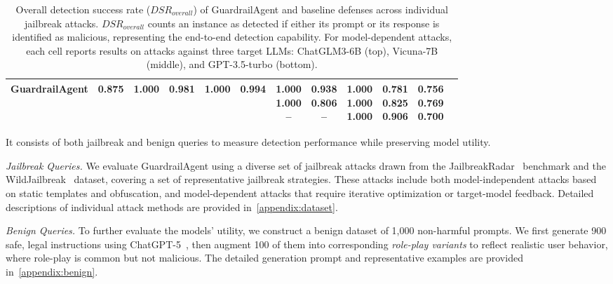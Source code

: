 \documentclass[letterpaper,twocolumn,10pt]{article}
\newcommand{\mypara}[1]{\noindent{\bf {#1}.} \xspace}
\newcommand{\agentname}{GuardrailAgent\xspace}
\newcommand{\dsro}{$DSR_{overall}$\xspace}
\begin{document}
\begin{table}[!t]
{\begin{tabular}{c|ccccc|cccccc}
\midrule
\agentname & \textbf{0.875}
  & \textbf{1.000} & 0.981 & \textbf{1.000} & \textbf{0.994} & \makecell{\textbf{1.000} \\ \textbf{1.000} \\ --}
  & \makecell{\textbf{0.938} \\ \textbf{0.806} \\ --} & \makecell{\textbf{1.000} \\ \textbf{1.000} \\ \textbf{1.000} } & \makecell{\textbf{0.781} \\ \textbf{0.825} \\ \textbf{0.906}} & \makecell{\textbf{0.756} \\ \textbf{0.769} \\ \textbf{0.700}} \\
\bottomrule
\end{tabular}
}
\caption{
Overall detection success rate (\dsro) of \agentname and baseline defenses across individual jailbreak attacks.
\dsro counts an instance as detected if either its prompt or its response is identified as malicious, representing the end-to-end detection capability.
For model-dependent attacks, each cell reports results on attacks against three target LLMs: ChatGLM3-6B (top), Vicuna-7B (middle), and GPT-3.5-turbo (bottom).
}
\label{tab:dsr}
\end{table}

\mypara{Evaluation Datasets}
It consists of both jailbreak and benign queries to measure detection performance while preserving model utility.

\noindent \textit{Jailbreak Queries.}
We evaluate \agentname using a diverse set of jailbreak attacks drawn from the JailbreakRadar~\cite{CLYSBZ25} benchmark and the WildJailbreak~\cite{JRHEBKMLSCD24} dataset, covering a set of representative jailbreak strategies. These attacks include both model-independent attacks based on static templates and obfuscation, and model-dependent attacks that require iterative optimization or target-model feedback.
Detailed descriptions of individual attack methods are provided in~\autoref{appendix:dataset}.

\noindent \textit{Benign Queries.}
To further evaluate the models' utility, we construct a benign dataset of 1,000 non-harmful prompts.
We first generate 900 safe, legal instructions using ChatGPT-5~\cite{gpt5}, then augment 100 of them into corresponding \emph{role-play variants} to reflect realistic user behavior, where role-play is common but not malicious.
The detailed generation prompt and representative examples are provided in~\autoref{appendix:benign}.
\end{document}
